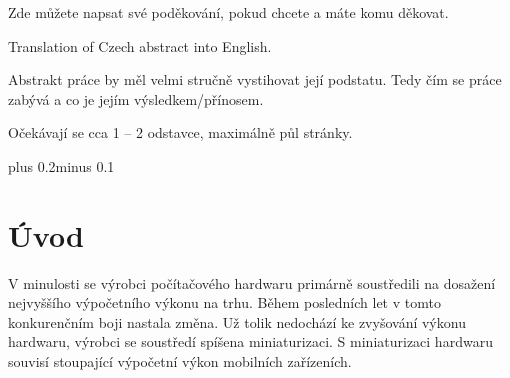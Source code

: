 \documentclass[11pt,twoside,a4paper]{book}
\begin{document}
\coverpagestarts

\acknowledgements
\noindent
Zde můžete napsat své poděkování, pokud chcete a máte komu děkovat.




\abstractpage
Translation of Czech abstract into English.


\baselineskip

\noindent
Abstrakt práce by měl velmi stručně vystihovat její podstatu. Tedy čím se práce zabývá a co je jejím výsledkem/přínosem.

\noindent
Očekávají se cca 1 -- 2 odstavce, maximálně půl stránky.

\tableofcontents


\listoffigures


\listoftables


\mainbodystarts
\normalfont
{}\baselineskip plus 0.2\baselineskip minus 0.1\baselineskip



% 
% 

\chapter{Úvod}
V minulosti se výrobci počítačového hardwaru primárně soustředili na dosažení nejvyššího výpočetního výkonu na trhu. Během posledních let v tomto konkurenčním boji nastala změna. Už tolik nedochází ke zvyšování výkonu hardwaru, výrobci se soustředí spíše\linebreak na miniaturizaci. S miniaturizaci hardwaru souvisí stoupající výpočetní výkon mobilních zařízeních. 
\end{document}
